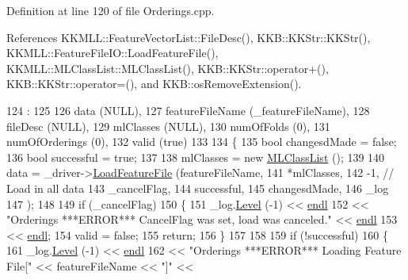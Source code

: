 Definition at line 120 of file Orderings.\+cpp.



References K\+K\+M\+L\+L\+::\+Feature\+Vector\+List\+::\+File\+Desc(), K\+K\+B\+::\+K\+K\+Str\+::\+K\+K\+Str(), K\+K\+M\+L\+L\+::\+Feature\+File\+I\+O\+::\+Load\+Feature\+File(), K\+K\+M\+L\+L\+::\+M\+L\+Class\+List\+::\+M\+L\+Class\+List(), K\+K\+B\+::\+K\+K\+Str\+::operator+(), K\+K\+B\+::\+K\+K\+Str\+::operator=(), and K\+K\+B\+::os\+Remove\+Extension().


\begin{DoxyCode}
124                      :
125   
126   data            (NULL),
127   featureFileName (\_featureFileName),
128   fileDesc        (NULL),
129   mlClasses       (NULL),
130   numOfFolds      (0),
131   numOfOrderings  (0),
132   valid           (\textcolor{keyword}{true})
133 
134 \{
135   \textcolor{keywordtype}{bool}  changesdMade = \textcolor{keyword}{false};
136   \textcolor{keywordtype}{bool}  successful   = \textcolor{keyword}{true};
137 
138   mlClasses = \textcolor{keyword}{new} \hyperlink{class_k_k_m_l_l_1_1_m_l_class_list}{MLClassList} ();
139 
140   data = \_driver->\hyperlink{class_k_k_m_l_l_1_1_feature_file_i_o_a75a8d10d3981811ab10357f6a95c9bc1}{LoadFeatureFile} (featureFileName, 
141                                    *mlClasses,
142                                    -1,  \textcolor{comment}{// Load in all data}
143                                    \_cancelFlag,
144                                    successful,
145                                    changesdMade,
146                                    \_log
147                                   );
148 
149   \textcolor{keywordflow}{if}  (\_cancelFlag)
150   \{
151     \_log.\hyperlink{class_k_k_b_1_1_run_log_a32cf761d7f2e747465fd80533fdbb659}{Level} (-1) << \hyperlink{namespace_k_k_b_ad1f50f65af6adc8fa9e6f62d007818a8}{endl}
152                    << \textcolor{stringliteral}{"Orderings   ***ERROR***   CancelFlag was set,   load was canceled."} << 
      \hyperlink{namespace_k_k_b_ad1f50f65af6adc8fa9e6f62d007818a8}{endl}
153                    << \hyperlink{namespace_k_k_b_ad1f50f65af6adc8fa9e6f62d007818a8}{endl};
154     valid = \textcolor{keyword}{false};
155     \textcolor{keywordflow}{return};
156   \}
157 
158 
159   \textcolor{keywordflow}{if}  (!successful)
160   \{
161     \_log.\hyperlink{class_k_k_b_1_1_run_log_a32cf761d7f2e747465fd80533fdbb659}{Level} (-1) << \hyperlink{namespace_k_k_b_ad1f50f65af6adc8fa9e6f62d007818a8}{endl}
162                    << \textcolor{stringliteral}{"Orderings   ***ERROR***   Loading Feature File["} << featureFileName << \textcolor{stringliteral}{"]"} << 

\end{DoxyCode}
